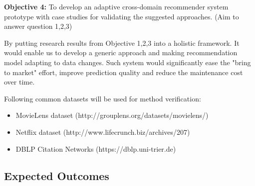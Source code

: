 \bigskip
\textbf{Objective 4:} To develop an adaptive cross-domain recommender system prototype with case studies for validating the suggested approaches. (Aim to answer question 1,2,3)

By putting research results from Objective 1,2,3 into a holistic framework. It would enable us to develop a generic approach and making recommendation model adapting to data changes. Such system would significantly ease the "bring to market" effort, improve prediction quality and reduce the maintenance cost over time. 

Following common datasets will be used for method verification: 

\begin{itemize}

\item MovieLens dataset (http://grouplens.org/datasets/movielens/) 

\item Netflix dataset (http://www.lifecrunch.biz/archives/207) 

\item DBLP Citation Networks (https://dblp.uni-trier.de)  

\end{itemize}


\subsection*{Expected Outcomes}

